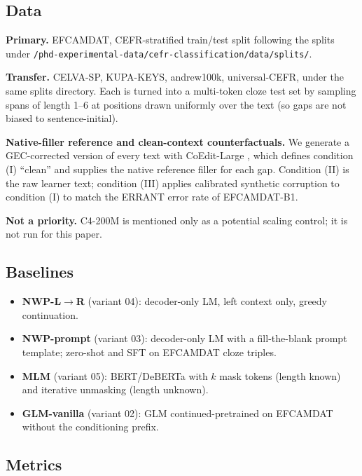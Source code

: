 \documentclass[11pt]{article}
\begin{document}
\subsection{Data}
\label{sec:data}

\textbf{Primary.} EFCAMDAT, CEFR-stratified train/test split following the
splits under
\texttt{\small/phd-experimental-data/cefr-classification/data/splits/}.

\textbf{Transfer.} CELVA-SP, KUPA-KEYS, andrew100k, universal-CEFR,
under the same splits directory. Each is turned into a multi-token cloze
test set by sampling spans of length 1--6 at positions drawn uniformly
over the text (so gaps are not biased to sentence-initial).

\textbf{Native-filler reference and clean-context counterfactuals.} We
generate a GEC-corrected version of every text with CoEdit-Large
\citep{raheja2023coedit}, which defines condition (I) ``clean'' and
supplies the native reference filler for each gap. Condition (II) is the
raw learner text; condition (III) applies calibrated synthetic corruption
to condition (I) to match the ERRANT error rate of EFCAMDAT-B1.

\textbf{Not a priority.} C4-200M is mentioned only as a potential scaling
control; it is not run for this paper.

\subsection{Baselines}
\label{sec:baselines}
\begin{itemize}[leftmargin=*,itemsep=0.15em]
    \item \textbf{NWP-L$\rightarrow$R} (variant 04): decoder-only LM, left
    context only, greedy continuation.
    \item \textbf{NWP-prompt} (variant 03): decoder-only LM with a
    fill-the-blank prompt template; zero-shot and SFT on EFCAMDAT cloze
    triples.
    \item \textbf{MLM} (variant 05): BERT/DeBERTa with $k$ mask tokens
    (length known) and iterative unmasking (length unknown).
    \item \textbf{GLM-vanilla} (variant 02): GLM continued-pretrained on
    EFCAMDAT without the conditioning prefix.
\end{itemize}

\subsection{Metrics}
\label{sec:metrics}
\end{document}
